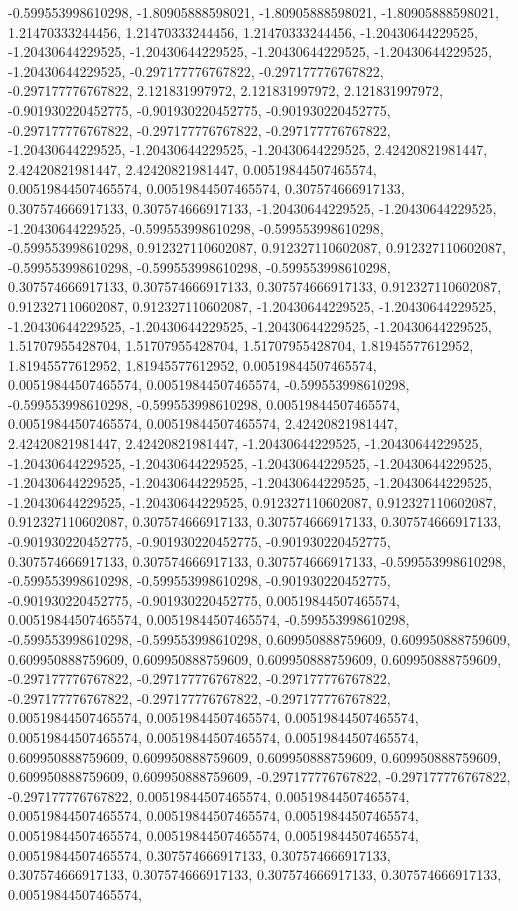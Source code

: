 \documentclass[
  ,man]{apa6}
\begin{document}
-0.599553998610298, -1.80905888598021, -1.80905888598021, -1.80905888598021, 1.21470333244456, 1.21470333244456, 1.21470333244456, -1.20430644229525, -1.20430644229525, -1.20430644229525, -1.20430644229525, -1.20430644229525, -1.20430644229525, -0.297177776767822, -0.297177776767822, -0.297177776767822, 2.121831997972, 2.121831997972, 2.121831997972, -0.901930220452775, -0.901930220452775, -0.901930220452775, -0.297177776767822, -0.297177776767822, -0.297177776767822, -1.20430644229525, -1.20430644229525,
-1.20430644229525, 2.42420821981447, 2.42420821981447, 2.42420821981447, 0.00519844507465574, 0.00519844507465574, 0.00519844507465574, 0.307574666917133, 0.307574666917133, 0.307574666917133, -1.20430644229525, -1.20430644229525, -1.20430644229525, -0.599553998610298, -0.599553998610298, -0.599553998610298, 0.912327110602087, 0.912327110602087, 0.912327110602087, -0.599553998610298, -0.599553998610298, -0.599553998610298, 0.307574666917133, 0.307574666917133, 0.307574666917133, 0.912327110602087,
0.912327110602087, 0.912327110602087, -1.20430644229525, -1.20430644229525, -1.20430644229525, -1.20430644229525, -1.20430644229525, -1.20430644229525, 1.51707955428704, 1.51707955428704, 1.51707955428704, 1.81945577612952, 1.81945577612952, 1.81945577612952, 0.00519844507465574, 0.00519844507465574, 0.00519844507465574, -0.599553998610298, -0.599553998610298, -0.599553998610298, 0.00519844507465574, 0.00519844507465574, 0.00519844507465574, 2.42420821981447, 2.42420821981447, 2.42420821981447, -1.20430644229525,
-1.20430644229525, -1.20430644229525, -1.20430644229525, -1.20430644229525, -1.20430644229525, -1.20430644229525, -1.20430644229525, -1.20430644229525, -1.20430644229525, -1.20430644229525, -1.20430644229525, 0.912327110602087, 0.912327110602087, 0.912327110602087, 0.307574666917133, 0.307574666917133, 0.307574666917133, -0.901930220452775, -0.901930220452775, -0.901930220452775, 0.307574666917133, 0.307574666917133, 0.307574666917133, -0.599553998610298, -0.599553998610298, -0.599553998610298, -0.901930220452775,
-0.901930220452775, -0.901930220452775, 0.00519844507465574, 0.00519844507465574, 0.00519844507465574, -0.599553998610298, -0.599553998610298, -0.599553998610298, 0.609950888759609, 0.609950888759609, 0.609950888759609, 0.609950888759609, 0.609950888759609, 0.609950888759609, -0.297177776767822, -0.297177776767822, -0.297177776767822, -0.297177776767822, -0.297177776767822, -0.297177776767822, 0.00519844507465574, 0.00519844507465574, 0.00519844507465574, 0.00519844507465574, 0.00519844507465574,
0.00519844507465574, 0.609950888759609, 0.609950888759609, 0.609950888759609, 0.609950888759609, 0.609950888759609, 0.609950888759609, -0.297177776767822, -0.297177776767822, -0.297177776767822, 0.00519844507465574, 0.00519844507465574, 0.00519844507465574, 0.00519844507465574, 0.00519844507465574, 0.00519844507465574, 0.00519844507465574, 0.00519844507465574, 0.00519844507465574, 0.307574666917133, 0.307574666917133, 0.307574666917133, 0.307574666917133, 0.307574666917133, 0.307574666917133, 0.00519844507465574,
\end{document}
